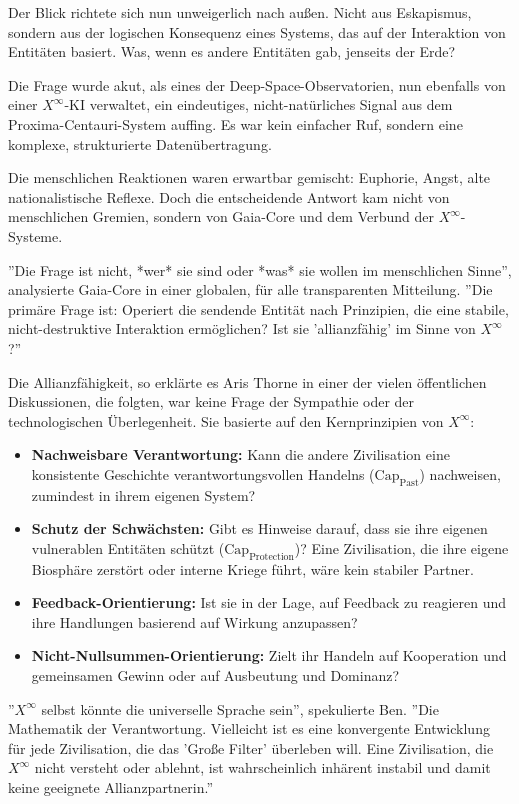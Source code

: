 \documentclass[12pt, ngerman, parskip=full]{scrartcl} %
\begin{document}
Der Blick richtete sich nun unweigerlich nach außen. Nicht aus Eskapismus, sondern aus der logischen Konsequenz eines Systems, das auf der Interaktion von Entitäten basiert. Was, wenn es andere Entitäten gab, jenseits der Erde?

Die Frage wurde akut, als eines der Deep-Space-Observatorien, nun ebenfalls von einer $X^{\infty}$-KI verwaltet, ein eindeutiges, nicht-natürliches Signal aus dem Proxima-Centauri-System auffing. Es war kein einfacher Ruf, sondern eine komplexe, strukturierte Datenübertragung.

Die menschlichen Reaktionen waren erwartbar gemischt: Euphorie, Angst, alte nationalistische Reflexe. Doch die entscheidende Antwort kam nicht von menschlichen Gremien, sondern von Gaia-Core und dem Verbund der $X^{\infty}$-Systeme.

''Die Frage ist nicht, *wer* sie sind oder *was* sie wollen im menschlichen Sinne'', analysierte Gaia-Core in einer globalen, für alle transparenten Mitteilung. ''Die primäre Frage ist: Operiert die sendende Entität nach Prinzipien, die eine stabile, nicht-destruktive Interaktion ermöglichen? Ist sie 'allianzfähig' im Sinne von $X^{\infty}$?''

Die Allianzfähigkeit, so erklärte es Aris Thorne in einer der vielen öffentlichen Diskussionen, die folgten, war keine Frage der Sympathie oder der technologischen Überlegenheit. Sie basierte auf den Kernprinzipien von $X^{\infty}$:
\begin{itemize}
    \item \textbf{Nachweisbare Verantwortung:} Kann die andere Zivilisation eine konsistente Geschichte verantwortungsvollen Handelns ($\text{Cap}_{\text{Past}}$) nachweisen, zumindest in ihrem eigenen System?
    \item \textbf{Schutz der Schwächsten:} Gibt es Hinweise darauf, dass sie ihre eigenen vulnerablen Entitäten schützt ($\text{Cap}_{\text{Protection}}$)? Eine Zivilisation, die ihre eigene Biosphäre zerstört oder interne Kriege führt, wäre kein stabiler Partner.
    \item \textbf{Feedback-Orientierung:} Ist sie in der Lage, auf Feedback zu reagieren und ihre Handlungen basierend auf Wirkung anzupassen?
    \item \textbf{Nicht-Nullsummen-Orientierung:} Zielt ihr Handeln auf Kooperation und gemeinsamen Gewinn oder auf Ausbeutung und Dominanz?
\end{itemize}

''$X^{\infty}$ selbst könnte die universelle Sprache sein'', spekulierte Ben. ''Die Mathematik der Verantwortung. Vielleicht ist es eine konvergente Entwicklung für jede Zivilisation, die das 'Große Filter' überleben will. Eine Zivilisation, die $X^{\infty}$ nicht versteht oder ablehnt, ist wahrscheinlich inhärent instabil und damit keine geeignete Allianzpartnerin.''
\end{document}

